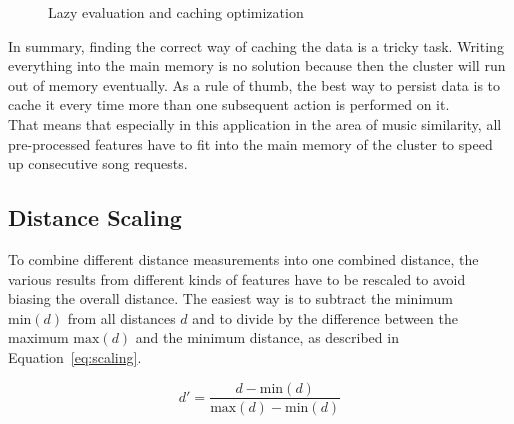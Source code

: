 \begin{figure}[htbp]
	\centering
	\caption{Lazy evaluation and caching optimization}
	\label{lazcach}
\end{figure}
\FloatBarrier

\noindent In summary, finding the correct way of caching the data is a tricky task. Writing everything into the main memory is no solution because then the cluster will run out of memory eventually. As a rule of thumb, the best way to persist data is to cache it every time more than one subsequent action is performed on it.\\
That means that especially in this application in the area of music similarity, all pre-processed features have to fit into the main memory of the cluster to speed up consecutive song requests. 

\subsection{Distance Scaling}\label{distsc}

To combine different distance measurements into one combined distance, the various results from different kinds of features have to be rescaled to avoid biasing the overall distance.
The easiest way is to subtract the minimum $\text{min}(d)$ from all distances $d$ and to divide by the difference between the maximum $\text{max}(d)$ and the minimum distance, as described in Equation~\eqref{eq:scaling}. 

\begin{equation} \label{eq:scaling}
d' = \frac{d - \text{min}(d)}{\text{max}(d) - \text{min}(d)}
\end{equation}

